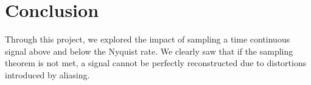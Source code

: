 \documentclass{article}
\begin{document}
    
    



\section{Conclusion}
Through this project, we explored the impact of sampling a time continuous signal above and below the Nyquist rate.
We clearly saw that if the sampling theorem is not met, a signal cannot be perfectly reconstructed due to distortions introduced by aliasing.
\end{document}
